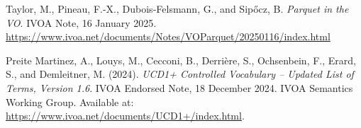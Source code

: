 \documentclass[11pt,a4paper]{ivoa}
\begin{document}
\begin{thebibliography}{}
Taylor, M., Pineau, F.-X., Dubois-Felsmann, G., and Sipőcz, B. \emph{Parquet in the VO}. IVOA Note, 16 January 2025. \url{https://www.ivoa.net/documents/Notes/VOParquet/20250116/index.html}

Preite Martinez, A., Louys, M., Cecconi, B., Derrière, S., Ochsenbein, F., Erard, S., and Demleitner, M. (2024). \emph{UCD1+ Controlled Vocabulary – Updated List of Terms, Version 1.6}. IVOA Endorsed Note, 18 December 2024. IVOA Semantics Working Group. Available at: \url{https://www.ivoa.net/documents/UCD1+/index.html}.

\end{thebibliography}
\end{document}
